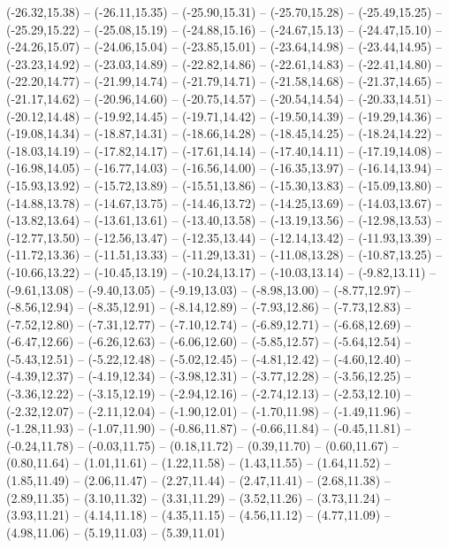 {  (-26.32,15.38) -- (-26.11,15.35) -- (-25.90,15.31) -- (-25.70,15.28) -- (-25.49,15.25) -- (-25.29,15.22) -- (-25.08,15.19) --
  (-24.88,15.16) -- (-24.67,15.13) -- (-24.47,15.10) -- (-24.26,15.07) -- (-24.06,15.04) -- (-23.85,15.01) -- (-23.64,14.98) --
  (-23.44,14.95) -- (-23.23,14.92) -- (-23.03,14.89) -- (-22.82,14.86) -- (-22.61,14.83) -- (-22.41,14.80) -- (-22.20,14.77) --
  (-21.99,14.74) -- (-21.79,14.71) -- (-21.58,14.68) -- (-21.37,14.65) -- (-21.17,14.62) -- (-20.96,14.60) -- (-20.75,14.57) --
  (-20.54,14.54) -- (-20.33,14.51) -- (-20.12,14.48) -- (-19.92,14.45) -- (-19.71,14.42) -- (-19.50,14.39) -- (-19.29,14.36) --
  (-19.08,14.34) -- (-18.87,14.31) -- (-18.66,14.28) -- (-18.45,14.25) -- (-18.24,14.22) -- (-18.03,14.19) -- (-17.82,14.17) --
  (-17.61,14.14) -- (-17.40,14.11) -- (-17.19,14.08) -- (-16.98,14.05) -- (-16.77,14.03) -- (-16.56,14.00) -- (-16.35,13.97) --
  (-16.14,13.94) -- (-15.93,13.92) -- (-15.72,13.89) -- (-15.51,13.86) -- (-15.30,13.83) -- (-15.09,13.80) -- (-14.88,13.78) --
  (-14.67,13.75) -- (-14.46,13.72) -- (-14.25,13.69) -- (-14.03,13.67) -- (-13.82,13.64) -- (-13.61,13.61) -- (-13.40,13.58) --
  (-13.19,13.56) -- (-12.98,13.53) -- (-12.77,13.50) -- (-12.56,13.47) -- (-12.35,13.44) -- (-12.14,13.42) -- (-11.93,13.39) --
  (-11.72,13.36) -- (-11.51,13.33) -- (-11.29,13.31) -- (-11.08,13.28) -- (-10.87,13.25) -- (-10.66,13.22) -- (-10.45,13.19) --
  (-10.24,13.17) -- (-10.03,13.14) -- (-9.82,13.11) -- (-9.61,13.08) -- (-9.40,13.05) -- (-9.19,13.03) -- (-8.98,13.00) --
  (-8.77,12.97) -- (-8.56,12.94) -- (-8.35,12.91) -- (-8.14,12.89) -- (-7.93,12.86) -- (-7.73,12.83) -- (-7.52,12.80) --
  (-7.31,12.77) -- (-7.10,12.74) -- (-6.89,12.71) -- (-6.68,12.69) -- (-6.47,12.66) -- (-6.26,12.63) -- (-6.06,12.60) --
  (-5.85,12.57) -- (-5.64,12.54) -- (-5.43,12.51) -- (-5.22,12.48) -- (-5.02,12.45) -- (-4.81,12.42) -- (-4.60,12.40) --
  (-4.39,12.37) -- (-4.19,12.34) -- (-3.98,12.31) -- (-3.77,12.28) -- (-3.56,12.25) -- (-3.36,12.22) -- (-3.15,12.19) --
  (-2.94,12.16) -- (-2.74,12.13) -- (-2.53,12.10) -- (-2.32,12.07) -- (-2.11,12.04) -- (-1.90,12.01) -- (-1.70,11.98) --
  (-1.49,11.96) -- (-1.28,11.93) -- (-1.07,11.90) -- (-0.86,11.87) -- (-0.66,11.84) -- (-0.45,11.81) -- (-0.24,11.78) --
  (-0.03,11.75) -- (0.18,11.72) -- (0.39,11.70) -- (0.60,11.67) -- (0.80,11.64) -- (1.01,11.61) -- (1.22,11.58) --
  (1.43,11.55) -- (1.64,11.52) -- (1.85,11.49) -- (2.06,11.47) -- (2.27,11.44) -- (2.47,11.41) -- (2.68,11.38) --
  (2.89,11.35) -- (3.10,11.32) -- (3.31,11.29) -- (3.52,11.26) -- (3.73,11.24) -- (3.93,11.21) -- (4.14,11.18) --
  (4.35,11.15) -- (4.56,11.12) -- (4.77,11.09) -- (4.98,11.06) -- (5.19,11.03) -- (5.39,11.01)}
